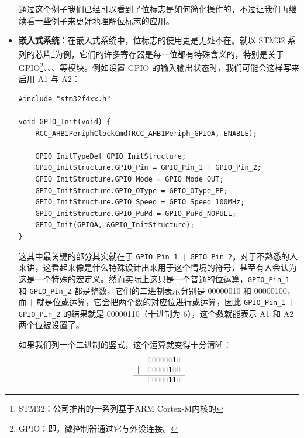 \begin{itemize}
    通过这个例子我们已经可以看到了位标志是如何简化操作的，不过让我们再继续看一些例子来更好地理解位标志的应用。

    \item \textbf{嵌入式系统}：在嵌入式系统中，位标志的使用更是无处不在。就以 STM32 系列的芯片\footnote{STM32：公司推出的一系列基于ARM Cortex-M内核的}为例，它们的许多寄存器是每一位都有特殊含义的，特别是关于 GPIO\footnote{GPIO：即，微控制器通过它与外设连接。}、、、等模块。例如设置 GPIO 的输入输出状态时，我们可能会这样写来启用 A1 与 A2：
    \begin{verbatim}
#include "stm32f4xx.h"

void GPIO_Init(void) {
    RCC_AHB1PeriphClockCmd(RCC_AHB1Periph_GPIOA, ENABLE);

    GPIO_InitTypeDef GPIO_InitStructure;
    GPIO_InitStructure.GPIO_Pin = GPIO_Pin_1 | GPIO_Pin_2;
    GPIO_InitStructure.GPIO_Mode = GPIO_Mode_OUT;
    GPIO_InitStructure.GPIO_OType = GPIO_OType_PP;
    GPIO_InitStructure.GPIO_Speed = GPIO_Speed_100MHz;
    GPIO_InitStructure.GPIO_PuPd = GPIO_PuPd_NOPULL;
    GPIO_Init(GPIOA, &GPIO_InitStructure);
}
    \end{verbatim}

    这其中最关键的部分其实就在于 \texttt{GPIO\_Pin\_1 | GPIO\_Pin\_2}。对于不熟悉的人来讲，这看起来像是什么特殊设计出来用于这个情境的符号，甚至有人会认为这是一个特殊的宏定义。然而实际上这只是一个普通的位运算，\texttt{GPIO\_Pin\_1} 和 \texttt{GPIO\_Pin\_2} 都是整数，它们的二进制表示分别是 00000010 和 00000100，而 \texttt{|} 就是位或运算，它会把两个数的对应位进行或运算，因此 \texttt{GPIO\_Pin\_1 | GPIO\_Pin\_2} 的结果就是 00000110（十进制为 6），这个数就能表示 A1 和 A2 两个位被设置了。

    如果我们列一个二进制的竖式，这个运算就变得十分清晰：
    \[
    \begin{array}{cc}
        & \color{lightgray}000000{\color{black}1}0 \\
        {|} & \color{lightgray}00000{\color{black}1}00 \\
        \hline
        & \color{lightgray}00000{\color{black}11}0
    \end{array}
    \]


\end{itemize}
